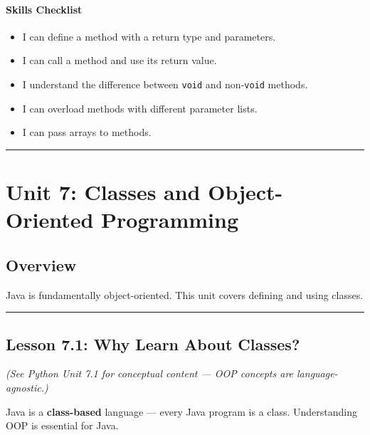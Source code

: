 \documentclass[
  justified,
  openright,
]{tufte-book}
\let\subsubsection\paragraph
\let\paragraph\paragraph
\let\subsubsection\paragraph
\let\paragraph\paragraph
\providecommand{\tightlist}{%
  \setlength{\itemsep}{0pt}\setlength{\parskip}{0pt}}
\begin{document}
\subsubsection{Skills Checklist}\label{skills-checklist-14}

\begin{itemize}
\tightlist
\item[$\square$]
  I can define a method with a return type and parameters.
\item[$\square$]
  I can call a method and use its return value.
\item[$\square$]
  I understand the difference between \texttt{void} and
  non-\texttt{void} methods.
\item[$\square$]
  I can overload methods with different parameter lists.
\item[$\square$]
  I can pass arrays to methods.
\end{itemize}

\begin{center}\rule{0.5\linewidth}{0.5pt}\end{center}

\section{Unit 7: Classes and Object-Oriented
Programming}\label{unit-7-classes-and-object-oriented-programming}

\subsection{Overview}\label{overview-7}

Java is fundamentally object-oriented. This unit covers defining and
using classes.

\begin{center}\rule{0.5\linewidth}{0.5pt}\end{center}

\subsection{Lesson 7.1: Why Learn About
Classes?}\label{lesson-7.1-why-learn-about-classes}

\emph{(See Python Unit 7.1 for conceptual content --- OOP concepts are
language-agnostic.)}

Java is a \textbf{class-based} language --- every Java program is a
class. Understanding OOP is essential for Java.
\end{document}
